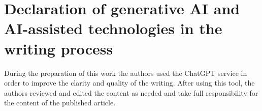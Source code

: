 \documentclass[preprint,3p]{elsarticle}
\numberwithin{equation}{section}
\begin{document}
\section*{Declaration of generative AI and AI-assisted technologies in the writing process}
During the preparation of this work the authors used the ChatGPT service in order to improve the clarity and quality of the writing. After using this tool, the authors reviewed and edited the content as needed and take full responsibility for the content of the published article.



\end{document}
